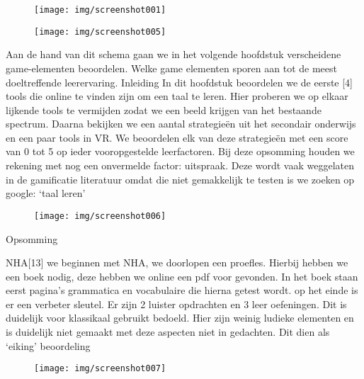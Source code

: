 \documentclass{hogent-article}
\begin{document}
\begin{figure}
    \centering
    \texttt{[image: img/screenshot001]}
    \caption{}
    \label{fig:screenshot001}
\end{figure}

\begin{figure}
    \centering
    \texttt{[image: img/screenshot005]}
    \caption{}
    \label{fig:screenshot005}
\end{figure}

Aan de hand van dit schema gaan we in het volgende hoofdstuk verscheidene game-elementen beoordelen.
Welke game elementen sporen aan tot de meest doeltreffende leerervaring.
Inleiding
In dit hoofdstuk beoordelen we de eerste [4] tools die online te vinden zijn om een taal te leren. Hier proberen we op elkaar lijkende tools te vermijden zodat we een beeld krijgen van het bestaande spectrum. Daarna bekijken we een aantal strategieën uit het secondair onderwijs en een paar tools in VR. We beoordelen elk van deze strategieën met een score van 0 tot 5 op ieder vooropgestelde leerfactoren. Bij deze opsomming houden we rekening met nog een onvermelde factor: uitspraak. Deze wordt vaak weggelaten in de gamificatie literatuur omdat die niet gemakkelijk te testen is we zoeken op google: ‘taal leren’ 

\begin{figure}
    \centering
    \texttt{[image: img/screenshot006]}
    \caption{}
    \label{fig:screenshot006}
\end{figure}


Opsomming

NHA[13]
we beginnen met NHA, we doorlopen een proefles. Hierbij hebben we een boek nodig, deze hebben we online een pdf voor gevonden. In het boek staan eerst pagina’s grammatica en vocabulaire die hierna getest wordt. op het einde is er een verbeter sleutel. Er zijn 2 luister opdrachten en 3 leer oefeningen. Dit is duidelijk voor klassikaal gebruikt bedoeld. Hier zijn weinig ludieke elementen en is duidelijk niet gemaakt met deze aspecten niet in gedachten. Dit dien als ‘eiking’ beoordeling

\begin{figure}
    \centering
    \texttt{[image: img/screenshot007]}
    \caption{}
    \label{fig:screenshot007}
\end{figure}
\end{document}
